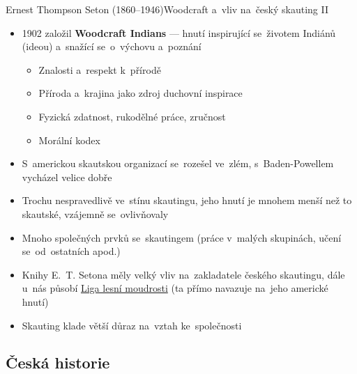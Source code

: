 \documentclass[compress, ucs, xelatex, 11pt, xcolor=dvipsnames, print,
	hyperref={
		bookmarks=true,
		unicode=true,
		colorlinks=true,
		pdftitle={Skautska vychovna metoda},
		plainpages=false,
		pdfauthor={Vojtech Zeisek},
		pdfsubject={Skautska vychovna metoda a jeji vyvoj za posledni stoleti a desetileti},
		pdfcreator={XeLaTeX},
		pdfkeywords={Junak, Pedagogika, Skaut, Skauting, Vychovna metoda},
		linkcolor=Black,
		anchorcolor=Black,
		citecolor=OliveGreen,
		filecolor=OliveGreen,
		menucolor=Black,
		urlcolor=OliveGreen,
		pdftex},
	url={hyphens, lowtilde} %
	]{beamer}
\begin{document}
\begin{frame}{Ernest Thompson Seton (1860--1946)}{Woodcraft a~vliv na~český skauting II}
	\begin{itemize}
		\item 1902 založil \textbf{Woodcraft Indians} --- hnutí inspirující se~životem Indiánů (ideou) a~snažící se~o~výchovu a~poznání
		\begin{itemize}
			\item Znalosti a~respekt k~přírodě
			\item Příroda a~krajina jako zdroj duchovní inspirace
			\item Fyzická zdatnost, rukodělné práce, zručnost
			\item Morální kodex
		\end{itemize}
		\item S~americkou skautskou organizací se~rozešel ve~zlém, s~Baden-Powellem vycházel velice dobře
		\item Trochu nespravedlivě ve~stínu skautingu, jeho hnutí je mnohem menší než to skautské, vzájemně se~ovlivňovaly
		\item Mnoho společných prvků se~skautingem (práce v~malých skupinách, učení se~od~ostatních apod.)
		\item Knihy E.~T. Setona měly velký vliv na~zakladatele českého skautingu, dále u~nás působí \href{https://www.woodcraft.cz/}{Liga lesní moudrosti} (ta přímo navazuje na~jeho americké hnutí)
		\item Skauting klade větší důraz na~vztah ke~společnosti
	\end{itemize}
\end{frame}

\subsection{Česká historie}
\end{document}
